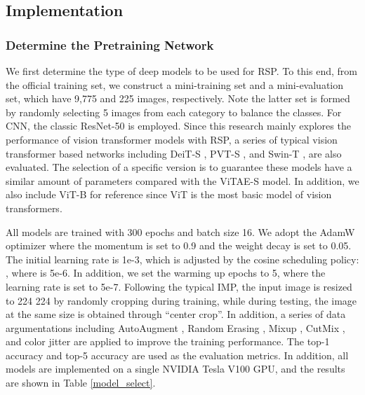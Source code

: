 \documentclass[10pt, journal,twoside]{IEEEtran}
\begin{document}
\subsection{Implementation}
\subsubsection{Determine the Pretraining Network}
\label{subsubsec:network}

We first determine the type of deep models to be used for RSP. To this end, from the official training set, we construct a mini-training set and a mini-evaluation set, which have 9,775 and 225 images, respectively. Note the latter set is formed by randomly selecting 5 images from each category to balance the classes. For CNN, the classic ResNet-50 \cite{resnet} is employed. Since this research mainly explores the performance of vision transformer models with RSP, a series of typical vision transformer based networks including DeiT-S \cite{deit}, PVT-S \cite{pvt}, and Swin-T \cite{swint}, are also evaluated. The selection of a specific version is to guarantee these models have a similar amount of parameters compared with the ViTAE-S model. In addition, we also include ViT-B \cite{vit} for reference since ViT is the most basic model of vision transformers. 

All models are trained with 300 epochs and batch size 16. We adopt the AdamW optimizer where the momentum is set to 0.9 and the weight decay is set to 0.05. The initial learning rate is 1e-3, which is adjusted by the cosine scheduling policy: , where  is 5e-6. In addition, we set the warming up epochs to 5, where the learning rate is set to 5e-7. Following the typical IMP, the input image is resized to 224  224 by randomly cropping during training, while during testing, the image at the same size is obtained through ``center crop''. In addition, a series of data argumentations including AutoAugment \cite{autoaugment}, Random Erasing \cite{random_erase}, Mixup \cite{mixup}, CutMix \cite{cutmix}, and color jitter are applied to improve the training performance. The top-1 accuracy and top-5 accuracy are used as the evaluation metrics. In addition, all models are implemented on a single NVIDIA Tesla V100 GPU, and the results are shown in Table \ref{model_select}.
\end{document}
